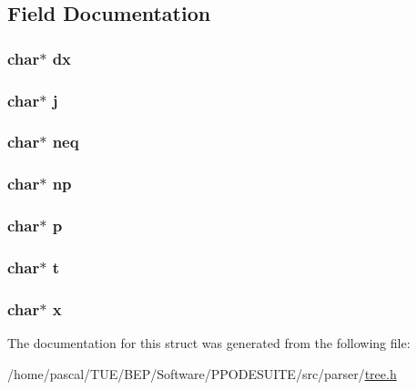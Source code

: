 \subsection{Field Documentation}
\hypertarget{struct_func_aa66668aed9b94cfd43d1d5fcad8e923d}{
\subsubsection[{dx}]{\setlength{\rightskip}{0pt plus 5cm}char$\ast$ dx}}\label{struct_func_aa66668aed9b94cfd43d1d5fcad8e923d}
\hypertarget{struct_func_aabe3f0c55a8ab8de92abb1da25c055db}{
\subsubsection[{j}]{\setlength{\rightskip}{0pt plus 5cm}char$\ast$ j}}\label{struct_func_aabe3f0c55a8ab8de92abb1da25c055db}
\hypertarget{struct_func_a26607bec2385a751e572c5aa9976262d}{
\subsubsection[{neq}]{\setlength{\rightskip}{0pt plus 5cm}char$\ast$ neq}}\label{struct_func_a26607bec2385a751e572c5aa9976262d}
\hypertarget{struct_func_ac5e9e8f42513fbf549dcde4107b633d0}{
\subsubsection[{np}]{\setlength{\rightskip}{0pt plus 5cm}char$\ast$ np}}\label{struct_func_ac5e9e8f42513fbf549dcde4107b633d0}
\hypertarget{struct_func_aaa1ebe818ec1c763a776cc580551f3e6}{
\subsubsection[{p}]{\setlength{\rightskip}{0pt plus 5cm}char$\ast$ p}}\label{struct_func_aaa1ebe818ec1c763a776cc580551f3e6}
\hypertarget{struct_func_a21feba301403a65090791a94f26c9d92}{
\subsubsection[{t}]{\setlength{\rightskip}{0pt plus 5cm}char$\ast$ t}}\label{struct_func_a21feba301403a65090791a94f26c9d92}
\hypertarget{struct_func_a87d9da60be62fb1a74b56404c392bf74}{
\subsubsection[{x}]{\setlength{\rightskip}{0pt plus 5cm}char$\ast$ x}}\label{struct_func_a87d9da60be62fb1a74b56404c392bf74}


The documentation for this struct was generated from the following file\-:\begin{DoxyCompactItemize}
\item 
/home/pascal/\-T\-U\-E/\-B\-E\-P/\-Software/\-P\-P\-O\-D\-E\-S\-U\-I\-T\-E/src/parser/\hyperlink{tree_8h}{tree.\-h}\end{DoxyCompactItemize}
